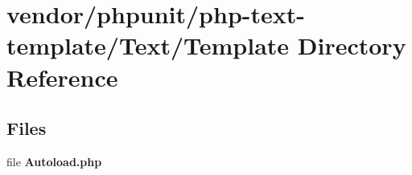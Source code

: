 \section{vendor/phpunit/php-\/text-\/template/\+Text/\+Template Directory Reference}
\label{dir_7816a8432f0e8782477151c151318280}
\subsection*{Files}
\begin{DoxyCompactItemize}
\item 
file {\bf Autoload.\+php}
\end{DoxyCompactItemize}

